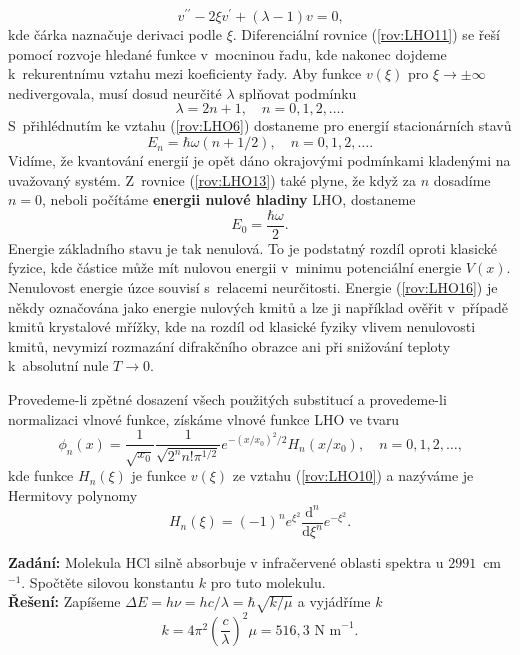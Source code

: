 \begin{equation}
v^{\prime\prime} - 2\xi v^{\prime} + (\lambda - 1)v = 0 \mbox{,}
\label{rov:LHO11}
\end{equation}
kde čárka naznačuje derivaci podle $\xi$. Diferenciální rovnice (\ref{rov:LHO11}) se řeší pomocí rozvoje hledané funkce v~mocninou řadu, kde nakonec dojdeme k~rekurentnímu vztahu mezi koeficienty řady. Aby funkce $v(\xi)$ pro $\xi \rightarrow \pm \infty$ nedivergovala, musí dosud neurčité $\lambda$ splňovat podmínku
\begin{equation}
\lambda = 2n + 1, \quad n=0,1,2, \dots \mbox{.}
\label{rov:LHO12}
\end{equation}
S~přihlédnutím ke vztahu (\ref{rov:LHO6}) dostaneme pro energií stacionárních stavů
\begin{equation}
\boxed{E_n = \hbar \omega (n+ 1/2), \quad n=0,1,2, \dots \mbox{.}}
\label{rov:LHO13}
\end{equation}
Vidíme, že kvantování energií je opět dáno okrajovými podmínkami kladenými na uvažovaný systém. Z~rovnice (\ref{rov:LHO13}) také plyne, že když za $n$ dosadíme $n=0$, neboli počítáme \textbf{energii nulové hladiny} LHO, dostaneme
\begin{equation}
E_0 = \frac{\hbar \omega}{2} \mbox{.}
\label{rov:LHO16}
\end{equation}
Energie základního stavu je tak nenulová. To je podstatný rozdíl oproti klasické fyzice, kde částice může mít nulovou energii v~minimu potenciální energie $V(x)$. Nenulovost energie úzce souvisí s~relacemi neurčitosti. Energie (\ref{rov:LHO16}) je někdy označována jako energie nulových kmitů a lze ji například ověřit v~případě kmitů krystalové mřížky, kde na rozdíl od klasické fyziky vlivem nenulovosti kmitů, nevymizí rozmazání difrakčního obrazce ani při snižování teploty k~absolutní nule $T \rightarrow 0$.

Provedeme-li zpětné dosazení všech použitých substitucí a provedeme-li normalizaci vlnové funkce, získáme vlnové funkce LHO ve tvaru
\begin{equation}
\phi_n(x)=\frac{1}{\sqrt{x_0}}\frac{1}{\sqrt{2^n n! \pi^{1/2}}}e^{-(x/x_0)^2/2}H_n(x/x_0), \quad n=0,1,2, \dots \mbox{,}
\label{rov:LHO14}
\end{equation}
kde funkce $H_n(\xi)$ je funkce $v(\xi)$ ze vztahu (\ref{rov:LHO10}) a nazýváme je Hermitovy polynomy
\begin{equation}
H_n(\xi) = (-1)^n e^{\xi^2} \frac{\mathrm{d}^n}{\mathrm{d}\xi^n}e^{-\xi^2} \mbox{.}
\label{rov:LHO15}
\end{equation}

\begin{priklad}
\textbf{Zadání:} Molekula HCl silně absorbuje v infračervené oblasti spektra u $2991$~cm$^{-1}$. Spočtěte silovou konstantu $k$ pro tuto molekulu.\\[0.1cm]
\textbf{Řešení:} Zapíšeme $\Delta E = h \nu = h c / \lambda = \hbar \sqrt{k/\mu}$ a vyjádříme $k$
\begin{displaymath}
k = 4 \pi^2 \left( \frac{c}{\lambda} \right)^2 \mu = 516{,}3 \mbox{ N m}^{-1}.
\end{displaymath} \vspace{-0.7cm}
\end{priklad}

